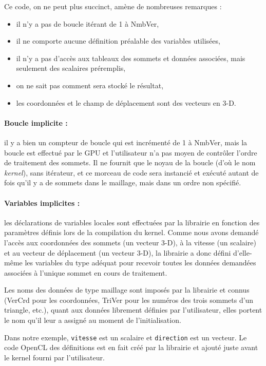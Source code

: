 \documentclass[a4paper,12pt]{article}
\begin{document}
Ce code, on ne peut plus succinct, amène de nombreuses remarques :

\begin{itemize}
\item il n'y a pas de boucle itérant de 1 à NmbVer,
\item il ne comporte aucune définition préalable des variables utilisées,
\item il n'y a pas d'accès aux tableaux des sommets et données associées, mais seulement des scalaires préremplis,
\item on ne sait pas comment sera stocké le résultat,
\item les coordonnées et le champ de déplacement sont des vecteurs en 3-D.
\end{itemize}

\paragraph{Boucle implicite : } il y a bien un compteur de boucle qui est incrémenté de 1 à NmbVer, mais la boucle est effectué par le GPU et l'utilisateur n'a pas moyen de contrôler l'ordre de traitement des sommets.
Il ne fournit que le noyau de la boucle (d'où le nom \emph{kernel}), sans itérateur, et ce morceau de code sera instancié et exécuté autant de fois qu'il y a de sommets dans le maillage, mais dans un ordre non spécifié.

\paragraph{Variables implicites : } les déclarations de variables locales sont effectuées par la librairie en fonction des paramètres définis lors de la compilation du kernel.
Comme nous avons demandé l'accès aux coordonnées des sommets (un vecteur 3-D), à la vitesse (un scalaire) et au vecteur de déplacement (un vecteur 3-D), la librairie a donc défini d'elle-même les variables du type adéquat pour recevoir toutes les données demandées associées à l'unique sommet en cours de traitement.

Les noms des données de type maillage sont imposés par la librairie et connus (VerCrd pour les coordonnées, TriVer pour les numéros des trois sommets d'un triangle, etc.), quant aux données librement définies par l'utilisateur, elles portent le nom qu'il leur a assigné au moment de l'initialisation.

Dans notre exemple, {\tt vitesse} est un scalaire et {\tt direction} est un vecteur. Le code OpenCL des définitions est en fait créé par la librairie et ajouté juste avant le kernel fourni par l'utilisateur.
\end{document}
